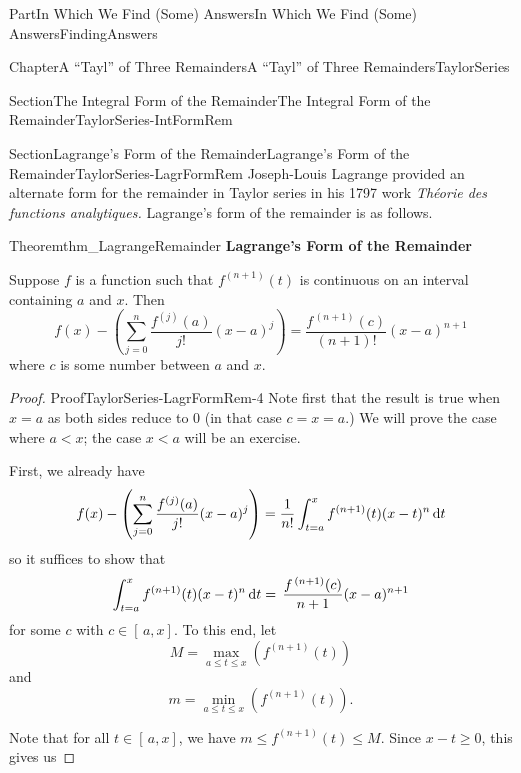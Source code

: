 \documentclass[oneside,10pt,]{book}
\newcommand{\terminology}[1]{\textbf{#1}}
\newcommand{\pubtitle}[1]{\textsl{#1}}
\numberwithin{equation}{part}
\newcommand{\dx}[1]{\,{\rm d}#1}
\newcommand{\lt}{<}
\begin{document}
\begin{partptx}{Part}{In Which We Find (Some) Answers}{}{In Which We Find (Some) Answers}{}{}{FindingAnswers}
\begin{chapterptx}{Chapter}{A ``Tayl'' of Three Remainders}{}{A ``Tayl'' of Three Remainders}{}{}{TaylorSeries}
\begin{sectionptx}{Section}{The Integral Form of the Remainder}{}{The Integral Form of the Remainder}{}{}{TaylorSeries-IntFormRem}
\end{sectionptx}
%
%
\typeout{************************************************}
\typeout{************************************************}
%
\begin{sectionptx}{Section}{Lagrange's Form of the Remainder}{}{Lagrange's Form of the Remainder}{}{}{TaylorSeries-LagrFormRem}
Joseph-Louis Lagrange  provided an alternate form for the remainder in Taylor series in his 1797 work \pubtitle{Théorie des functions analytiques.} Lagrange's form of the remainder is as follows.%
\begin{theorem}{Theorem}{}{}{thm_LagrangeRemainder}%
\terminology{Lagrange's Form of the Remainder}%
\par
{} Suppose \(f\) is a function such that \(f^{(n+1)}(t)\) is continuous on an interval containing \(a\) and \(x\). Then%
\begin{equation*}
f(x)-\left(\sum_{j=0}^n\frac{f^{(j)}(a)}{j!}(x-a)^j\right)=\frac{f^{\, (n+1)}(c)}{(n+1)!}(x-a)^{n+1}
\end{equation*}
where \(c\) is some number between \(a\) and \(x\).%
\end{theorem}
\begin{proof}{Proof}{}{TaylorSeries-LagrFormRem-4}
Note first that the result is true when \(x=a\) as both sides reduce to 0 (in that case \(c=x=a\).) We will prove the case where \(a\lt x\); the case \(x\lt a\) will be an exercise.%
\par
First, we already have%
\begin{equation*}
f(x)-\left(\sum_{j=0}^n\frac{f^{(j)}(a)}{j!}(x-a)^j\right)=\frac{1}{n!} \int_{t=a}^xf^{(n+1)}(t)(x-t)^n\dx{ t}
\end{equation*}
so it suffices to show that%
\begin{equation*}
\int_{t=a}^xf^{(n+1)}(t)(x-t)^n\dx{ t}=\,\frac{f^{\,(n+1)}(c)}{n+1}(x-a)^{n+1}
\end{equation*}
for some \(c\) with \(c\in[\,a,x]\). To this end, let%
\begin{equation*}
M=\max_{a\le t\le x}\left(f^{(n+1)}(t)\right)
\end{equation*}
and%
\begin{equation*}
m=\min_{a\le t\le x}\left(f^{(n+1)}(t)\right)\text{.}
\end{equation*}
%
\par
Note that for all \(t\in[\,a,x]\), we have \(m\leq f^{(n+1)}(t)\leq M\). Since \(x-t\geq 0\), this gives us%

\end{proof}
\end{sectionptx}
\end{chapterptx}
\end{partptx}
\end{document}
